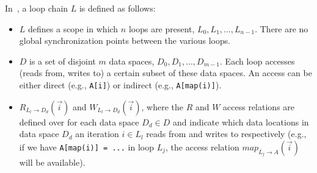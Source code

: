In~\cite{ST-KriegerHIPS2013,KriegerThesis}, a loop chain $L$ is defined as follows:
\begin{itemize}
\item $L$ defines a scope in which $n$ loops are present, $L_0, L_1, ..., L_{n-1}$. There are no global synchronization points between the various loops.
\item $D$ is a set of disjoint $m$ data spaces, $D_0, D_1, ..., D_{m-1}$. Each loop accesses (reads from, writes to) a certain subset of these data spaces. An access can be either direct (e.g., \texttt{A[i]}) or indirect (e.g., \texttt{A[map(i)]}).
\item $R_{L_l\rightarrow D_d}(\vec{i})$ and $W_{L_l\rightarrow D_d}(\vec{i})$, where the $R$ and $W$ access relations are defined over for each data space $D_d \in D$ and indicate which data locations in data space $D_d$ an iteration $i \in L_l$ reads from and writes to respectively (e.g., if we have \texttt{A[map(i)] = ...} in loop $L_j$, the access relation $map_{L_j\rightarrow A}(\vec{i})$ will be available). 
\end{itemize}

